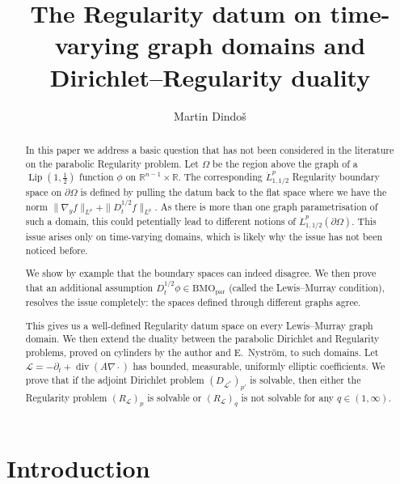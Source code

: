 \documentclass[12pt,leqno]{amsart}
\numberwithin{equation}{section}
\DeclareMathOperator{\Lip}{Lip}
\DeclareMathOperator{\divg}{div}
\newcommand{\R}{\mathbb R}
\newcommand{\om}{\Omega}
\newcommand{\pom}{\partial\Omega}
\newcommand{\pd}{\partial}
\newcommand{\dhalf}{D_t^{1/2}}
\newcommand{\BMOpar}{\mathrm{BMO}_{\mathrm{par}}}
\newcommand{\LL}{\mathcal L}
\theoremstyle{plain}
\theoremstyle{remark}
\begin{document}
\title[The Regularity datum and Dirichlet--Regularity duality]{The Regularity datum
on time-varying graph domains and Dirichlet--Regularity duality}

\author{Martin Dindo\v{s}}
\address{School of Mathematics, 
The University of Edinburgh and Maxwell Institute of Mathematical Sciences, Edinburgh, UK}


\begin{abstract}
In this paper we address a basic question that has not been considered in the
literature on the parabolic Regularity problem. Let $\om$ be the region above
the graph of a $\Lip(1,\tfrac12)$ function $\phi$ on
$\R^{n-1}\times\R$. The corresponding $\dot L^p_{1,1/2}$  Regularity boundary space on
$\pom$ is defined by pulling the datum back to the flat space where we have the norm
$\|\nabla_y f\|_{L^p}+\|\dhalf f\|_{L^p}$.  As there is more than one graph parametrisation of such a domain, this could petentially lead to different notions of
$\dot L^p_{1,1/2}(\pom)$. This issue arises only on time-varying domains,
which is likely why the issue has not been noticed before.

We show by example that the boundary spaces can indeed disagree. We then
prove that an additional assumption $\dhalf\phi\in\BMOpar$ (called the
Lewis--Murray condition), resolves the issue completely: the spaces defined
through different graphs agree.\medskip

This gives us a well-defined Regularity datum space on every Lewis--Murray graph
domain. We then extend the duality between the parabolic Dirichlet and
Regularity problems, proved on cylinders by the author and E.~Nystr\"om,
 to such domains. Let
$\LL=-\pd_t+\divg(A\nabla\cdot)$ has bounded, measurable, uniformly elliptic
coefficients. We prove that if the adjoint Dirichlet problem
$(D_{\LL^*})_{p'}$ is solvable, then either the Regularity problem
$(R_\LL)_p$ is solvable or $(R_\LL)_q$ is not solvable for any
$q\in(1,\infty)$. 
\end{abstract}

\maketitle

\section{Introduction}\label{S.intro}
\end{document}
